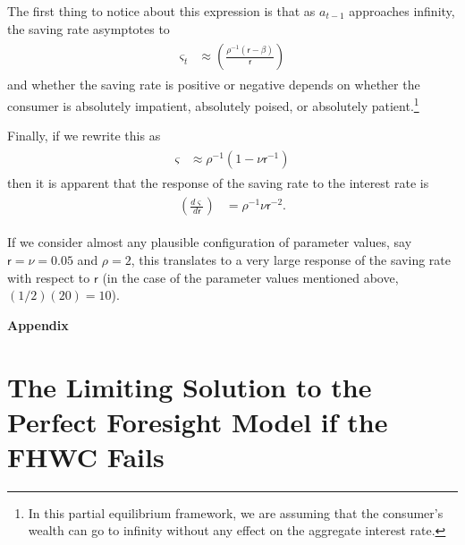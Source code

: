 \documentclass{scrartcl}
\begin{document}
The first thing to notice about this expression is that as $a_{t-1}$ approaches infinity, the saving rate asymptotes to 
\begin{equation}\begin{gathered}\begin{aligned}
\varsigma_{t} & \approx  \left(\frac{\rho^{-1}(\mathsf{r}-\beta)}{\mathsf{r}}\right)
\end{aligned}\end{gathered}\end{equation}
and whether the saving rate is positive or negative depends on whether the consumer is absolutely impatient, absolutely poised, or absolutely patient.\footnote{In this partial equilibrium framework, we are assuming that the consumer's wealth can go to infinity without any effect on the aggregate interest rate.}

Finally, if we rewrite this as 
\begin{equation}\begin{gathered}\begin{aligned}
\varsigma & \approx  \rho^{-1} (1 - \nu \mathsf{r}^{-1})
\end{aligned}\end{gathered}\end{equation}
then it is apparent that the response of the saving rate to the interest rate is 
\begin{equation}\begin{gathered}\begin{aligned}
  \label{eq:dsdr}
  \left(\frac{d \varsigma}{d \mathsf{r}}\right) & =  \rho^{-1}\nu \mathsf{r}^{-2}.
\end{aligned}\end{gathered}\end{equation}

If we consider almost any plausible configuration of parameter values, say $\mathsf{r} = \nu=0.05$ and $\rho = 2$, this translates to a very large response of the saving rate with respect to $\mathsf{r}$ (in the case of the parameter values mentioned above, $(1/2)(20)=10$).


\pagebreak\appendix
\centerline\textbf{\LARGE Appendix}\medskip

\setcounter{section}{0}

\section{The Limiting Solution to the Perfect Foresight Model if the FHWC Fails}\label{sec:PFwhenFHWfails}
\end{document}
